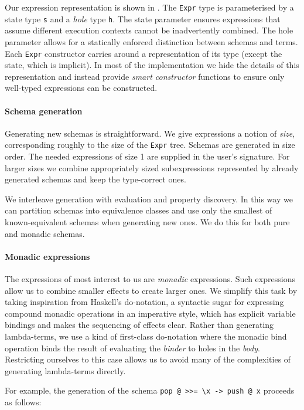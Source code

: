 Our expression representation is shown in .  The
\verb|Expr| type is parameterised by a state type \verb|s| and a
\emph{hole} type \verb|h|.  The state parameter ensures expressions
that assume different execution contexts cannot be inadvertently
combined.  The hole parameter allows for a statically enforced
distinction between schemas and terms.  Each \verb|Expr| constructor
carries around a representation of its type (except the state, which
is implicit).  In most of the implementation we hide the details of
this representation and instead provide \emph{smart constructor}
functions to ensure only well-typed expressions can be constructed.

\paragraph{Schema generation}
Generating new schemas is straightforward.  We give expressions a
notion of \emph{size}, corresponding roughly to the size of the
\verb|Expr| tree.  Schemas are generated in size order.  The needed
expressions of size 1 are supplied in the user's signature.  For
larger sizes we combine appropriately sized subexpressions represented
by already generated schemas and keep the type-correct ones.

We interleave generation with evaluation and property discovery.  In
this way we can partition schemas into equivalence classes and use
only the smallest of known-equivalent schemas when generating new
ones.  We do this for both pure and monadic schemas.

\paragraph{Monadic expressions}
The expressions of most interest to us are \emph{monadic} expressions.
Such expressions allow us to combine smaller effects to create larger
ones.  We simplify this task by taking inspiration from Haskell's
do-notation, a syntactic sugar for expressing compound monadic
operations in an imperative style, which has explicit variable
bindings and makes the sequencing of effects clear.  Rather than
generating lambda-terms, we use a kind of first-class do-notation
where the monadic bind operation binds the result of evaluating the
\emph{binder} to holes in the \emph{body}.  Restricting ourselves to
this case allows us to avoid many of the complexities of generating
lambda-terms directly.

For example, the generation of the schema
\verb|pop @ >>= \x -> push @ x| proceeds as follows:

